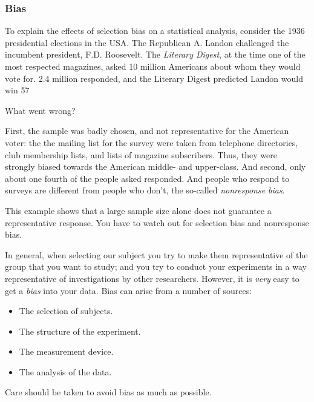 \subsubsection{Bias} 
To explain the effects of selection bias on a statistical analysis, consider the 1936 presidential elections in the USA. The Republican A. Landon challenged the incumbent president, F.D. Roosevelt. The \emph{Literary Digest}, at the time one of the most respected magazines, asked 10 million Americans about whom they would vote for. 2.4 million responded, and the Literary Digest predicted Landon would win 57%

What went wrong?

First, the sample was badly chosen, and not representative for the American voter: the the mailing list for the survey were taken from telephone directories, club membership lists, and lists of magazine subscribers. Thus, they were strongly biased towards the American middle- and upper-class. And second, only about one fourth of the people asked responded. And people who respond to surveys are different from people who don't, the so-called \emph{nonresponse bias}.

This example shows that a large sample size alone does not guarantee a representative response. You have to watch out for selection bias and nonresponse bias.

In general, when selecting our subject you try to make them representative of the group that you want to study; and you try to conduct your experiments in a way representative of investigations by other researchers. However, it is \emph{very} easy to get a \emph{bias} into your data. Bias can arise from a number of sources:
\begin{itemize}
  \item The selection of subjects.
  \item The structure of the experiment.
  \item The measurement device.
  \item The analysis of the data.
\end{itemize}
Care should be taken to avoid bias as much as possible.

